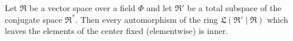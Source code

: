 Let $\mathfrak{R}$ be a vector space over a field $\Phi$ and let $\mathfrak{R}'$ be a total subspace of the conjugate space $\mathfrak{R}^*$. Then every automorphism of the ring $\mathfrak{L}(\mathfrak{R}' \mid \mathfrak{R})$ which leaves the elements of the center fixed (elementwise) is inner.
